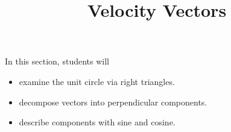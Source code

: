 \documentclass{ximera}
\title{Velocity Vectors}
\begin{document}
\begin{abstract}
\end{abstract}
\maketitle





\begin{sectionOutcomes}
In this section, students will 

\begin{itemize}
\item examine the unit circle via right triangles.
\item decompose vectors into perpendicular components.
\item describe components with sine and cosine.
\end{itemize}
\end{sectionOutcomes}
\end{document}
